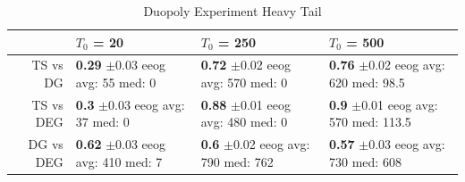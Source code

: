 \documentclass[11pt,letterpaper]{article}
\begin{document}
\begin{table}[H]
\centering
\caption{Duopoly Experiment Heavy Tail} 
\begin{tabular}{rlll}
  \hline
 & $T_0$ = 20 & $T_0$ = 250 & $T_0$ = 500 \\ 
  \hline
TS vs DG & \makecell{\textbf{0.29} $\pm$0.03\\ eeog \\ avg: 55\\ med: 0} & \makecell{\textbf{0.72} $\pm$0.02\\ eeog \\ avg: 570\\ med: 0} & \makecell{\textbf{0.76} $\pm$0.02\\ eeog \\ avg: 620\\ med: 98.5} \\ 
  TS vs DEG & \makecell{\textbf{0.3} $\pm$0.03\\ eeog \\ avg: 37\\ med: 0} & \makecell{\textbf{0.88} $\pm$0.01\\ eeog \\ avg: 480\\ med: 0} & \makecell{\textbf{0.9} $\pm$0.01\\ eeog \\ avg: 570\\ med: 113.5} \\ 
  DG vs DEG & \makecell{\textbf{0.62} $\pm$0.03\\ eeog \\ avg: 410\\ med: 7} & \makecell{\textbf{0.6} $\pm$0.02\\ eeog \\ avg: 790\\ med: 762} & \makecell{\textbf{0.57} $\pm$0.03\\ eeog \\ avg: 730\\ med: 608} \\ 
   \hline
\end{tabular}
\end{table}
\end{document}
